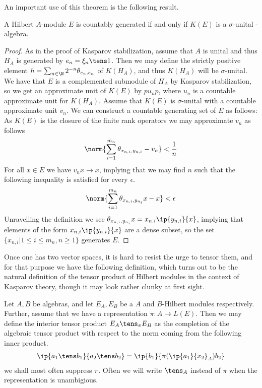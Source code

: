 An important use of this theorem is the following result.
\begin{proposition}
	A Hilbert $A$-module $E$ is countably generated if and only if $K(E)$ is a $\sigma$-unital \Cstar-algebra. 
\end{proposition}
\begin{proof}
	As in the proof of Kasparov stabilization, assume that $A$ is unital and thus $H_A$ is generated by $e_n=\xi_n\tens 1$. Then we may define the strictly positive element $h=\sum_{n\in \N} 2^{-n}\theta_{e_n,e_n}$ of $K(H_A)$, and thus $K(H_A)$ will be $\sigma$-unital. We have that $E$ is a complemented submodule of $H_A$ by Kasparov stabilization, so we get an approximate unit of $K(E)$ by $pu_np$, where $u_n$ is a countable approximate unit for $K(H_A)$. 
	Assume that $K(E)$ is $\sigma$-unital with a countable approximate unit $v_n$. We can construct a countable generating set of $E$ as follows:
	As $K(E)$ is the closure of the finite rank operators we may approximate $v_n$ as follows
	\begin{align*}
		\norm{\sum_{i=1}^{m_n} \theta_{x_{n,i},y_{n,i}}-v_n}<\frac{1}{n}
	\end{align*}
	For all $x\in E$ we have $v_nx\to x$, implying that we may find $n$ such that the following inequality is satisfied for every $\epsilon$. 
	\begin{align*}
		\norm{\sum_{i=1}^{m_n} \theta_{x_{n,i},y_{n_i}}x-x}<\epsilon
	\end{align*}
	Unravelling the definition we see $ \theta_{x_{n,i},y_{n_i}}x=x_{n,i}\ip{y_{n,i}}{x}$, implying that elements of the form $x_{n,i}\ip{y_{n,i}}{x}$ are a dense subset, so the set $\{x_{n,i}| 1\leq i \leq m_n,n\geq 1\}$ generates $E$. 
\end{proof}
 Once one has two vector spaces, it is hard to resist the urge to tensor them, and for that purpose we have the following definition, which turns out to be the natural definition of the tensor product of Hilbert \Cstar modules in the context of Kasparov theory, though it may look rather clunky at first sight. 
 \begin{definition}
	Let $A,B$ be \Cstar algebras, and let $E_A,E_B$ be a $A$ and $B$-Hilbert modules respectively. Further, assume that we have a representation $\pi: A\to L(E)$. Then we may define the interior tensor product $E_A\tens_\pi E_B$ as the completion of the algebraic tensor product with respect to the norm coming from the following inner product. 
	\begin{align*}
		\ip{a_1\tens b_1}{a_2\tens b_2}=\ip{b_1}{\pi(\ip{a_1}{x_2}_A) b_2}
	\end{align*}
	we shall most often suppress $\pi$. Often we will write $\tens_A$ instead of $\pi$ when the representation is unambigious. 
\end{definition}
